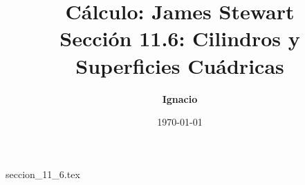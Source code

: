 \documentclass[11pt,spanish,oneside]{report}
\title{\textbf{Cálculo: James Stewart} \\ \Large Sección 11.6: Cilindros y Superficies Cuádricas}
\author{\textbf{Ignacio}}
\date{\today}
\begin{document}
\maketitle

{seccion_11_6.tex}
\end{document}
